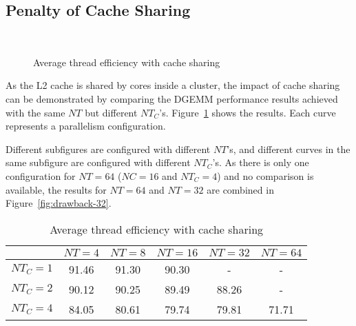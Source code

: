\subsection{Penalty of Cache Sharing}\label{subsec:drawback}

\begin{figure}
  \centering
  \\
  \caption{Average thread efficiency with cache sharing}
  \label{fig:drawback}
\end{figure}

As the L2 cache is shared by cores inside a cluster,
the impact of cache sharing can be demonstrated
by comparing the DGEMM performance results achieved
with the same $NT$
but different $NT_C$'s.
Figure~\ref{fig:drawback} shows the results.
Each curve represents a parallelism configuration.

Different subfigures are configured with different $NT$'s,
and different curves in the same subfigure are
configured with different $NT_C$'s.
As there is only one configuration for $NT=64$ ($NC=16$ and $NT_C=4$)
and no comparison is available,
the results for $NT=64$ and $NT=32$ are combined in Figure~\ref{fig:drawback-32}.

\begin{table}
  \centering
  \caption{Average thread efficiency with cache sharing}
  \label{tab:drawback}
  \begin{tabular}{cccccc}
    \toprule
     & $NT\!\!=\!\!4$ & $NT\!\!=\!\!8$ & $NT\!\!=\!\!16$ & $NT\!\!=\!\!32$ & $NT\!\!=\!\!64$ \\
    \midrule
    $NT_C\!\!=\!\!1$ & 91.46 & 91.30 & 90.30 & -     & - \\   
    $NT_C\!\!=\!\!2$ & 90.12 & 90.25 & 89.49 & 88.26 & - \\
    $NT_C\!\!=\!\!4$ & 84.05 & 80.61 & 79.74 & 79.81 & 71.71 \\
    \bottomrule
  \end{tabular}
\end{table}

